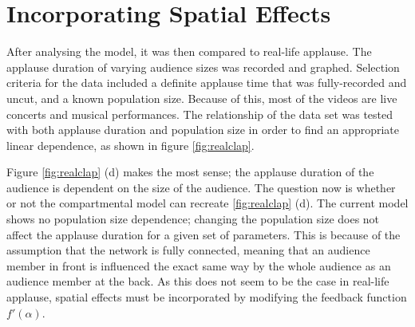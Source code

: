 \chapter{Incorporating Spatial Effects}
\label{chap4}

\hspace{\parindent} After analysing the model, it was then compared to real-life applause.
The applause duration of varying audience sizes was recorded and graphed. 
Selection criteria for the data included a definite applause time that was fully-recorded and uncut, and a known population size. 
Because of this, most of the videos are live concerts and musical performances.
The relationship of the data set was tested with both applause duration and population size in order to find an appropriate linear dependence, as shown in figure \ref{fig:realclap}.

Figure \ref{fig:realclap} (d) makes the most sense; the applause duration of the audience is dependent on the size of the audience.
The question now is whether or not the compartmental model can recreate \ref{fig:realclap} (d).
The current model shows no population size dependence; changing the population size does not affect the applause duration for a given set of parameters.
This is because of the assumption that the network is fully connected, meaning that an audience member in front is influenced the exact same way by the whole audience as an audience member at the back.
As this does not seem to be the case in real-life applause, spatial effects must be incorporated by modifying the feedback function $f'(\alpha)$.


